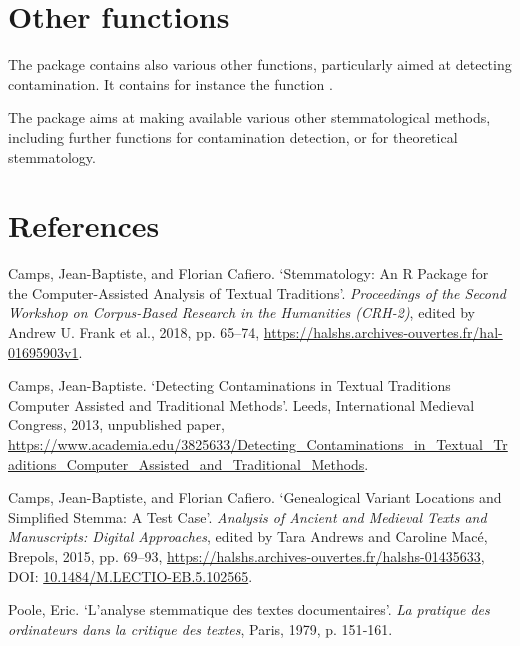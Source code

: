 \documentclass[article,nojss]{jss}
\begin{document}
\section{Other functions}
The package contains also various other functions, particularly aimed at
detecting contamination. It contains for instance the function .%

The package aims at making available various other stemmatological methods, including further functions for contamination detection, 
or for theoretical stemmatology.



\section*{References}

Camps, Jean-Baptiste, and Florian Cafiero. ‘Stemmatology: An R Package for the Computer-Assisted Analysis of Textual Traditions’. \emph{Proceedings of the Second Workshop on Corpus-Based Research in the Humanities (CRH-2)}, edited by Andrew U. Frank et al., 2018, pp. 65–74, \url{https://halshs.archives-ouvertes.fr/hal-01695903v1}.

Camps, Jean-Baptiste. ‘Detecting Contaminations in Textual Traditions
Computer Assisted and Traditional Methods’.  Leeds, International Medieval Congress, 2013, unpublished paper, \url{https://www.academia.edu/3825633/Detecting_Contaminations_in_Textual_Traditions_Computer_Assisted_and_Traditional_Methods}.

Camps, Jean-Baptiste, and Florian Cafiero. ‘Genealogical Variant Locations and Simplified Stemma: A Test Case’. \emph{Analysis of Ancient and Medieval Texts and Manuscripts: Digital Approaches}, edited by Tara Andrews and Caroline Macé, Brepols, 2015, pp. 69–93, \url{https://halshs.archives-ouvertes.fr/halshs-01435633}, DOI: \href{http://dx.doi.org/10.1484/M.LECTIO-EB.5.102565}{10.1484/M.LECTIO-EB.5.102565}.

Poole, Eric. ‘L’analyse stemmatique des textes documentaires’. \emph{La pratique des ordinateurs dans la critique des textes}, Paris, 1979, p. 151‑161.
\end{document}
